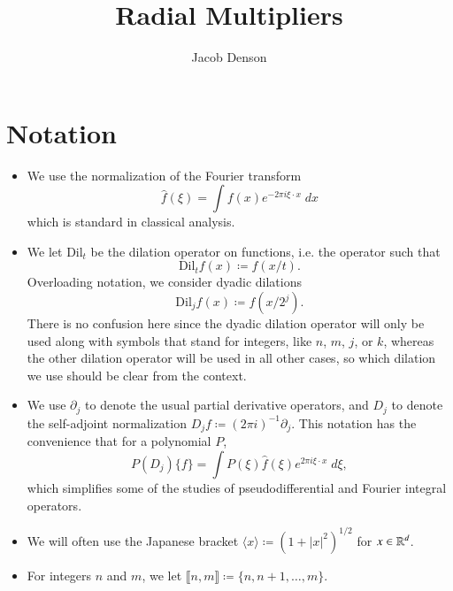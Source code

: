 

\title{Radial Multipliers}
\author{Jacob Denson}



\maketitle

\tableofcontents

\newpage

\chapter{Notation}

\begin{itemize}
    \item We use the normalization of the Fourier transform
    \[ \widehat{f}(\xi) = \int f(x) e^{- 2 \pi i \xi \cdot x}\; dx \]
    which is standard in classical analysis.

    \item We let $\text{Dil}_t$ be the dilation operator on functions, i.e. the operator such that
    \[ \text{Dil}_t f(x) \coloneqq f(x/t). \]
    Overloading notation, we consider dyadic dilations
    \[ \text{Dil}_j f(x) \coloneqq f(x/2^j). \]
    There is no confusion here since the dyadic dilation operator will only be used along with symbols that stand for integers, like $n$, $m$, $j$, or $k$, whereas the other dilation operator will be used in all other cases, so which dilation we use should be clear from the context.

    \item We use $\partial_j$ to denote the usual partial derivative operators, and $D_j$ to denote the self-adjoint normalization $D_j f \coloneqq (2 \pi i)^{-1} \partial_j$. This notation has the convenience that for a polynomial $P$,
    \[ P(D_j) \{ f \} = \int P(\xi) \widehat{f}(\xi) e^{2 \pi i \xi \cdot x}\; d\xi, \]
    which simplifies some of the studies of pseudodifferential and Fourier integral operators.

    \item We will often use the Japanese bracket $\langle x \rangle \coloneqq (1 + |x|^2)^{1/2}$ for $x \in \operatorname{\mathbb{R}}^d$.

    \item For integers $n$ and $m$, we let $\llbracket n,m \rrbracket \coloneqq \{ n, n+1, \dots, m \}$.
\end{itemize}

